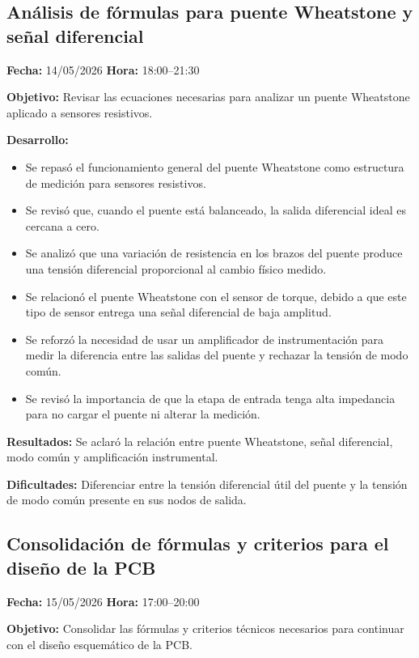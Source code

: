 \documentclass[12pt]{article}
\begin{document}
\subsection{Análisis de fórmulas para puente Wheatstone y señal diferencial}
\textbf{Fecha:} 14/05/2026 \quad \textbf{Hora:} 18:00--21:30

\textbf{Objetivo:}
Revisar las ecuaciones necesarias para analizar un puente Wheatstone aplicado a sensores resistivos.

\textbf{Desarrollo:}
\begin{itemize}
\item Se repasó el funcionamiento general del puente Wheatstone como estructura de medición para sensores resistivos.
\item Se revisó que, cuando el puente está balanceado, la salida diferencial ideal es cercana a cero.
\item Se analizó que una variación de resistencia en los brazos del puente produce una tensión diferencial proporcional al cambio físico medido.
\item Se relacionó el puente Wheatstone con el sensor de torque, debido a que este tipo de sensor entrega una señal diferencial de baja amplitud.
\item Se reforzó la necesidad de usar un amplificador de instrumentación para medir la diferencia entre las salidas del puente y rechazar la tensión de modo común.
\item Se revisó la importancia de que la etapa de entrada tenga alta impedancia para no cargar el puente ni alterar la medición.
\end{itemize}

\textbf{Resultados:}
Se aclaró la relación entre puente Wheatstone, señal diferencial, modo común y amplificación instrumental.

\textbf{Dificultades:}
Diferenciar entre la tensión diferencial útil del puente y la tensión de modo común presente en sus nodos de salida.

\subsection{Consolidación de fórmulas y criterios para el diseño de la PCB}
\textbf{Fecha:} 15/05/2026 \quad \textbf{Hora:} 17:00--20:00

\textbf{Objetivo:}
Consolidar las fórmulas y criterios técnicos necesarios para continuar con el diseño esquemático de la PCB.
\end{document}
